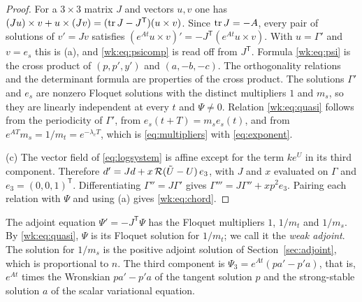 \begin{proof}
For a $3\times3$ matrix $J$ and vectors $u,v$ one has $(Ju)\times v+u\times(Jv)=(\operatorname{tr} J-J^{\mathsf T})(u\times v)$. Since $\operatorname{tr} J=-A$, every pair of solutions of $v'=Jv$ satisfies $(e^{At}u\times v)'=-J^{\mathsf T}(e^{At}u\times v)$. With $u=\Gamma'$ and $v=e_s$ this is (a), and \eqref{wk:eq:psicomp} is read off from $J^{\mathsf T}$. Formula \eqref{wk:eq:psi} is the cross product of $(p,p',y')$ and $(a,-b,-c)$. The orthogonality relations and the determinant formula are properties of the cross product. The solutions $\Gamma'$ and $e_s$ are nonzero Floquet solutions with the distinct multipliers $1$ and $m_s$, so they are linearly independent at every $t$ and $\Psi\ne0$. Relation \eqref{wk:eq:quasi} follows from the periodicity of $\Gamma'$, from $e_s(t+T)=m_se_s(t)$, and from $e^{AT}m_s=1/m_t=e^{-\lambda_cT}$, which is \eqref{eq:multipliers} with \eqref{eq:exponent}.

(c) The vector field of \eqref{eq:logsystem} is affine except for the term $ke^U$ in its third component. Therefore $d'=Jd+x\,\mathcal R(\tilde U-U)\,e_3$, with $J$ and $x$ evaluated on $\Gamma$ and $e_3=(0,0,1)^{\mathsf T}$. Differentiating $\Gamma''=J\Gamma'$ gives $\Gamma'''=J\Gamma''+xp^2e_3$. Pairing each relation with $\Psi$ and using (a) gives \eqref{wk:eq:chord}.
\end{proof}
The adjoint equation $\Psi'=-J^{\mathsf T}\Psi$ has the Floquet multipliers $1$, $1/m_t$ and $1/m_s$. By \eqref{wk:eq:quasi}, $\Psi$ is its Floquet solution for $1/m_t$; we call it the \emph{weak adjoint}. The solution for $1/m_s$ is the positive adjoint solution of Section~\ref{sec:adjoint}, which is proportional to $n$. The third component is $\Psi_3=e^{At}(pa'-p'a)$, that is, $e^{At}$ times the Wronskian $pa'-p'a$ of the tangent solution $p$ and the strong-stable solution $a$ of the scalar variational equation.

